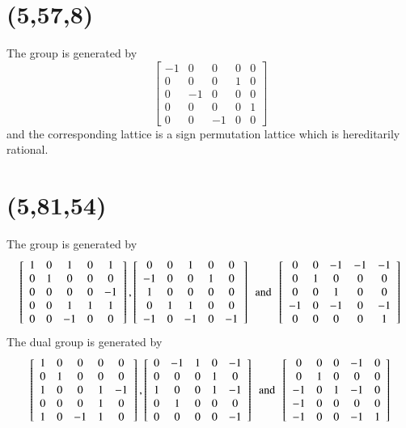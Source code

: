  \section{(5,57,8)}
The group is generated by 
$$
\left[ \begin {array}{ccccc} -1&0&0&0&0\\0&0&0&1&0
\\0&-1&0&0&0\\0&0&0&0&1
\\0&0&-1&0&0\end {array} \right] 
$$
and the corresponding lattice is a sign permutation lattice which is hereditarily rational.
  \section{(5,81,54)}
The group is generated by 
$$
 \left[ \begin {array}{ccccc} 1&0&1&0&1\\0&1&0&0&0
\\0&0&0&0&-1\\0&0&1&1&1
\\0&0&-1&0&0\end {array} \right],
 \left[ \begin {array}{ccccc} 0&0&1&0&0\\-1&0&0&1&0
\\1&0&0&0&0\\0&1&1&0&0
\\-1&0&-1&0&-1\end {array} \right]
\,\,\, \text{and} \,\,\,
 \left[ \begin {array}{ccccc} 0&0&-1&-1&-1\\0&1&0&0
&0\\0&0&1&0&0\\-1&0&-1&0&-1
\\0&0&0&0&1\end {array} \right] 
$$
The dual group is generated by 
$$
  \left[ \begin {array}{ccccc} 1&0&0&0&0\\0&1&0&0&0
\\1&0&0&1&-1\\0&0&0&1&0
\\1&0&-1&1&0\end {array} \right] ,
 \left[ \begin {array}{ccccc} 0&-1&1&0&-1\\0&0&0&1&0
\\1&0&0&1&-1\\0&1&0&0&0
\\0&0&0&0&-1\end {array} \right] 
\,\,\, \text{and} \,\,\,
 \left[ \begin {array}{ccccc} 0&0&0&-1&0\\0&1&0&0&0
\\-1&0&1&-1&0\\-1&0&0&0&0
\\-1&0&0&-1&1\end {array} \right] 
$$
